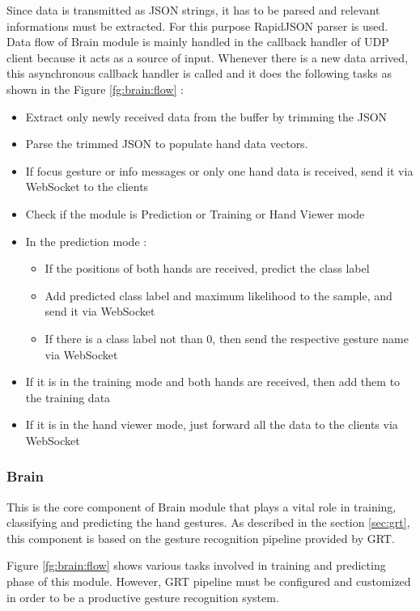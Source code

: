 Since data is transmitted as JSON strings, it has to be parsed and relevant informations must be extracted. For this purpose RapidJSON parser is used. Data flow of Brain module is mainly handled in the callback handler of UDP client because it acts as a source of input. Whenever there is a new data arrived, this asynchronous callback handler is called and it does the following tasks as shown in the Figure \ref{fg:brain:flow} : 
\begin{itemize}
	\item Extract only newly received data from the buffer by trimming the JSON 
	\item Parse the trimmed JSON to populate hand data vectors. 
	\item If focus gesture or info messages or only one hand data is received, send it via WebSocket to the clients 
	\item Check if the module is Prediction or Training or Hand Viewer mode 
	\item In the prediction mode : 
	\begin{itemize}
		\item If the positions of both hands are received, predict the class label 
		\item Add predicted class label and maximum likelihood to the sample, and send it via WebSocket 
		\item If there is a class label not than 0, then send the respective gesture name via WebSocket 
	\end{itemize}
	\item If it is in the training mode and both hands are received, then add them to the training data 
	\item If it is in the hand viewer mode, just forward all the data to the clients via WebSocket 
\end{itemize}

\subsubsection{Brain} This is the core component of Brain module that plays a vital role in training, classifying and predicting the hand gestures. As described in the section \ref{sec:grt}, this component is based on the gesture recognition pipeline provided by GRT.

Figure \ref{fg:brain:flow} shows various tasks involved in training and predicting phase of this module. However, GRT pipeline must be configured and customized in order to be a productive gesture recognition system.

